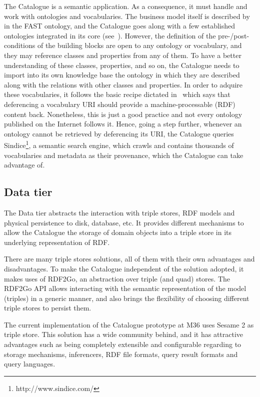 \documentclass{fast_latex}
\begin{document}
The Catalogue is a semantic application. As a consequence, it must handle and work with ontologies and vocabularies. The business model itself is described by in the FAST ontology, and the Catalogue goes along with a few established ontologies integrated in its core (see~\cite{moeller2011fast_ontology}). However, the definition of the pre-/post-conditions of the building blocks are open to any ontology or vocabulary, and they may reference classes and properties from any of them. To have a better understanding of these classes, properties, and so on, the Catalogue needs to import into its own knowledge base the ontology in which they are described along with the relations with other classes and properties. In order to adquire these vocabularies, it follows the basic recipe dictated in~\cite{berrueta2008} which says that deferencing a vocabulary URI should provide a machine-processable (RDF) content back. Nonetheless, this is just a good practice and not every ontology published on the Internet follows it. Hence, going a step further, whenever an ontology cannot be retrieved by deferencing its URI, the Catalogue queries Sindice\footnote{http://www.sindice.com/}, a semantic search engine, which crawls and contains thousands of vocabularies and metadata as their provenance, which the Catalogue can take advantage of.


\subsection{Data tier}

The Data tier abstracts the interaction with triple stores, RDF models and physical persistence to disk, database, etc. It provides different mechanisms to allow the Catalogue the storage of domain objects into a triple store in its underlying representation of RDF.

There are many triple stores solutions, all of them with their own advantages and disadvantages. To make the Catalogue independent of the solution adopted, it makes uses of RDF2Go, an abstraction over triple (and quad) stores. The RDF2Go API allows interacting with the semantic representation of the model (triples) in a generic manner, and also brings the flexibility of choosing different triple stores to persist them.

The current implementation of the Catalogue prototype at M36 uses Sesame 2 as triple store. This solution has a wide community behind, and it has attractive advantages such as being completely extensible and configurable regarding to storage mechanisms, inferencers, RDF file formats, query result formats and query languages.
\end{document}
